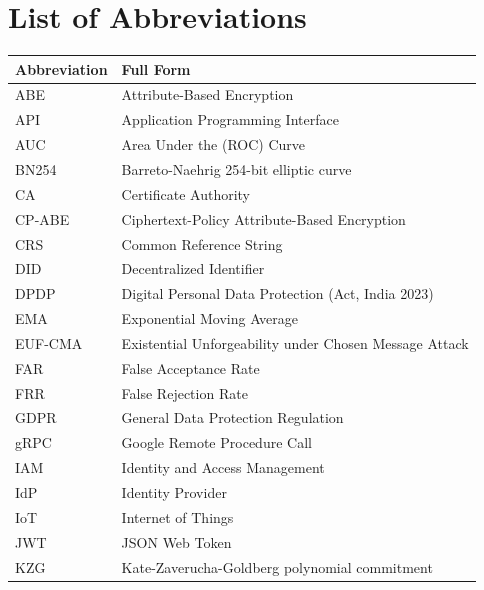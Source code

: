 \documentclass[12pt,a4paper,oneside]{report}
\begin{document}
\clearpage
\tableofcontents

\clearpage
{}
{}
\listoftables

\clearpage
{}
{}
\listoffigures

\clearpage
\chapter*{List of Abbreviations}

\begin{longtable}{p{3.5cm} p{10cm}}
\toprule
\textbf{Abbreviation} & \textbf{Full Form} \\
\midrule
\endhead
ABE     & Attribute-Based Encryption \\
API     & Application Programming Interface \\
AUC     & Area Under the (ROC) Curve \\
BN254   & Barreto-Naehrig 254-bit elliptic curve \\
CA      & Certificate Authority \\
CP-ABE  & Ciphertext-Policy Attribute-Based Encryption \\
CRS     & Common Reference String \\
DID     & Decentralized Identifier \\
DPDP    & Digital Personal Data Protection (Act, India 2023) \\
EMA     & Exponential Moving Average \\
EUF-CMA & Existential Unforgeability under Chosen Message Attack \\
FAR     & False Acceptance Rate \\
FRR     & False Rejection Rate \\
GDPR    & General Data Protection Regulation \\
gRPC    & Google Remote Procedure Call \\
IAM     & Identity and Access Management \\
IdP     & Identity Provider \\
IoT     & Internet of Things \\
JWT     & JSON Web Token \\
KZG     & Kate-Zaverucha-Goldberg polynomial commitment \\

\end{longtable}
\end{document}

